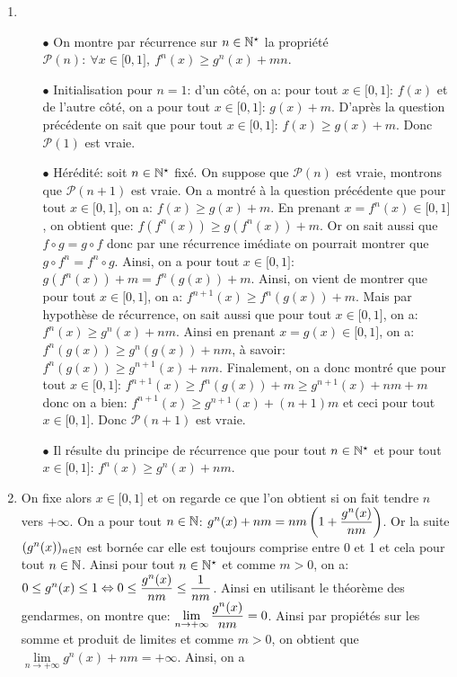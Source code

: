 \documentclass[a4paper, 11pt,reqno]{article}
\begin{document}
\begin{correction}
\begin{enumerate}
		\item
		      \begin{itemize}
			      \item[$\bullet$] On montre par r\'ecurrence sur $n\in\mathbb{N}^{\star}$ la propri\'et\'e $\mathcal{P}(n):\ \forall x\in\lbrack 0,1\rbrack,\ f^{n}(x)\geq g^n(x)+mn$.
			      \item[$\bullet$] Initialisation pour $n=1$: d'un c\^{o}t\'e, on a: pour tout $x\in\lbrack 0,1\rbrack$: $f(x)$ et de l'autre c\^{o}t\'e, on a pour tout $x\in\lbrack 0,1\rbrack$: $g(x)+m$. D'apr\`{e}s la question pr\'ec\'edente on sait que pour tout $x\in\lbrack 0,1\rbrack$: $f(x)\geq g(x)+m$. Donc $\mathcal{P}(1)$ est vraie.
			      \item[$\bullet$] H\'er\'edit\'e: soit $n\in\mathbb{N}^{\star}$ fix\'e. On suppose que $\mathcal{P}(n)$ est vraie, montrons que $\mathcal{P}(n+1)$ est vraie. On a montr\'e \`{a} la question pr\'ec\'edente que pour tout $x\in\lbrack 0,1\rbrack$, on a: $f(x)\geq g(x)+m$. En prenant $x=f^n(x)\in\lbrack 0,1\rbrack$, on obtient que: $f( f^n(x) )\geq  g( f^n(x) )+m$. Or on sait aussi que $f\circ g=g\circ f$ donc par une r\'ecurrence im\'ediate on pourrait montrer que $g\circ f^n=f^n\circ g$. Ainsi, on a pour tout $x\in\lbrack 0,1\rbrack$: $g( f^n(x) )+m=f^n( g(x) )+m$. Ainsi, on vient de montrer que pour tout $x\in\lbrack 0,1\rbrack$, on a: $f^{n+1}(x)\geq f^n(g(x))+m$. Mais par hypoth\`{e}se de r\'ecurrence, on sait aussi que pour tout $x\in\lbrack 0,1\rbrack$, on a:
			            $f^n(x)\geq g^n(x)+nm$. Ainsi en prenant $x=g(x)\in\lbrack 0,1\rbrack$, on a: $f^n( g(x))\geq g^n( g(x) )+nm$, \`{a} savoir: $f^n(g(x))\geq g^{n+1}(x)+nm$. Finalement, on a donc montr\'e que pour tout $x\in\lbrack 0,1\rbrack$:
			            $f^{n+1}(x)\geq f^n(g(x))+m\geq g^{n+1}(x)+nm+m$ donc on a bien: $f^{n+1}(x)\geq g^{n+1}(x)+(n+1)m$ et ceci pour tout $x\in\lbrack 0,1\rbrack$. Donc $\mathcal{P}(n+1)$ est vraie.
			      \item[$\bullet$] Il r\'esulte du principe de r\'ecurrence que pour tout $n\in\mathbb{N}^{\star}$ et pour tout $x\in\lbrack 0,1\rbrack$: $f^n(x)\geq g^n(x)+nm$.
		      \end{itemize}
		\item On fixe alors $x\in\lbrack 0,1\rbrack$ et on regarde ce que l'on obtient si on fait tendre $n$ vers $+\infty$. On a pour tout $n\in\mathbb{N}$: $g^n(x)+nm=nm\left(  1+\displaystyle\frac{g^n(x)}{nm}\right)$. Or la suite $(g^n(x))_{n\in\mathbb{N}}$ est born\'ee car elle est toujours comprise entre 0 et 1 et cela pour tout $n\in\mathbb{N}$. Ainsi pour tout $n\in\mathbb{N}^{\star}$ et comme $m>0$, on a: $0\leq g^n(x)\leq 1\Leftrightarrow 0\leq \displaystyle\frac{g^n(x)}{nm}\leq \displaystyle\frac{1}{nm}$. Ainsi en utilisant le th\'eor\`{e}me des gendarmes, on montre que: $\lim\limits_{n\to +\infty} \displaystyle\frac{g^n(x)}{nm}=0$. Ainsi par propi\'et\'es sur les somme et produit de limites et comme $m>0$, on obtient que $\lim\limits_{n\to +\infty} g^n(x)+nm=+\infty$. Ainsi, on a

\end{enumerate}
\end{correction}
\end{document}
